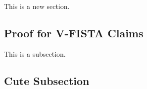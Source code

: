 This is a new section. 
\subsection{Proof for V-FISTA Claims}
This is a subsection. 

\subsection{Cute Subsection}

